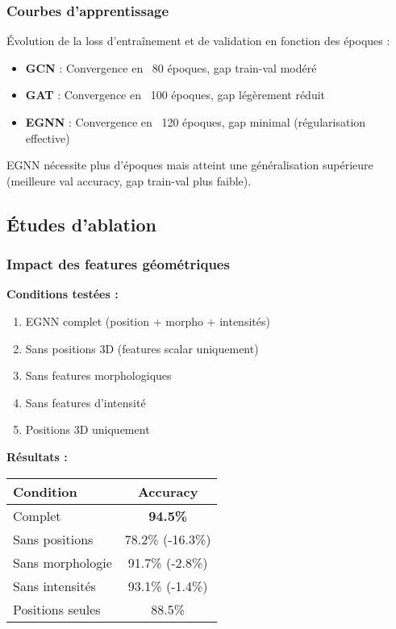 \subsubsection{Courbes d'apprentissage}

Évolution de la loss d'entraînement et de validation en fonction des époques :
\begin{itemize}
    \item \textbf{GCN} : Convergence en ~80 époques, gap train-val modéré
    \item \textbf{GAT} : Convergence en ~100 époques, gap légèrement réduit
    \item \textbf{EGNN} : Convergence en ~120 époques, gap minimal (régularisation effective)
\end{itemize}

EGNN nécessite plus d'époques mais atteint une généralisation supérieure (meilleure val accuracy, gap train-val plus faible).

\subsection{Études d'ablation}

\subsubsection{Impact des features géométriques}

\textbf{Conditions testées :}
\begin{enumerate}
    \item EGNN complet (position + morpho + intensités)
    \item Sans positions 3D (features scalar uniquement)
    \item Sans features morphologiques
    \item Sans features d'intensité
    \item Positions 3D uniquement
\end{enumerate}

\textbf{Résultats :}
\begin{center}
\begin{tabular}{|l|c|}
\hline
\textbf{Condition} & \textbf{Accuracy} \\
\hline
Complet & \textbf{94.5\%} \\
Sans positions & 78.2\% (-16.3\%) \\
Sans morphologie & 91.7\% (-2.8\%) \\
Sans intensités & 93.1\% (-1.4\%) \\
Positions seules & 88.5\% \\
\hline
\end{tabular}
\end{center}

